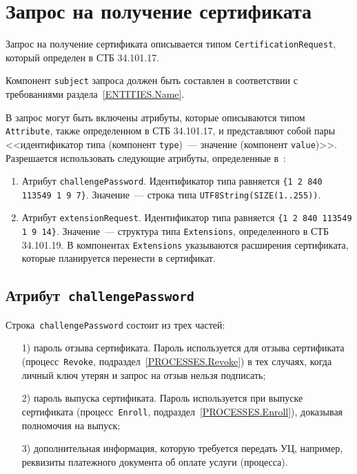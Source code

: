 \section{Запрос на получение сертификата}\label{FMT.CSR}

Запрос на получение сертификата описывается типом 
\texttt{CertificationRequest}, который определен в СТБ 34.101.17.

Компонент \texttt{subject} запроса должен быть составлен в соответствии
с требованиями раздела~\ref{ENTITIES.Name}.

В запрос могут быть включены атрибуты, которые описываются типом 
\texttt{Attribute}, также определенном в СТБ 34.101.17,
и представляют собой пары <<идентификатор типа (компонент \texttt{type})~---
значение (компонент \texttt{value})>>. Разрешается использовать следующие 
атрибуты, определенные в~\cite{PKCS9}:
\begin{enumerate}
\item
Атрибут \texttt{challengePassword}.
Идентификатор типа равняется \verb|{1 2 840 113549 1 9 7}|.
Значение~--- строка типа \verb|UTF8String(SIZE(1..255))|.

\item
Атрибут \texttt{extensionRequest}.
Идентификатор типа равняется \verb|{1 2 840 113549 1 9 14}|.
Значение~--- структура типа \verb|Extensions|, определенного в СТБ 34.101.19.
В компонентах \verb|Extensions| указываются расширения сертификата,
которые планируется перенести в сертификат.
\end{enumerate}

\subsection{Атрибут~\texttt{challengePassword}}\label{FMT.CSR.CP}

Строка~\texttt{challengePassword} состоит из трех частей:
\begin{enumerate} 
\item[1)]
пароль отзыва сертификата. Пароль используется для отзыва сертификата
(процесс~\texttt{Revoke}, подраздел~\ref{PROCESSES.Revoke})
в тех случаях, когда личный ключ утерян и запрос на отзыв нельзя 
подписать;
\item[2)]
пароль выпуска сертификата. Пароль используется при выпуске сертификата
(процесс~\texttt{Enroll}, подраздел~\ref{PROCESSES.Enroll}),
доказывая полномочия на выпуск;
\item[3)]
дополнительная информация, которую требуется передать УЦ,
например, реквизиты платежного документа об оплате услуги (процесса).
\end{enumerate}

